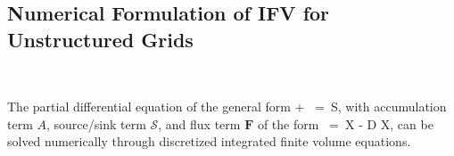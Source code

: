 \documentclass[12pt]{article}
\def\EQ#1\EN{\begin{equation}#1\end{equation}}
\newcommand{\eq}{\ =\ }
\newcommand{\p}{{\partial}}
\renewcommand{\S}{{\mathcal S}}
\newcommand{\bnabla}{\boldsymbol{\nabla}}
\newcommand{\bF}{\boldsymbol{F}}
\newcommand{\bq}{\boldsymbol{q}}
\begin{document}
\subsection*{Numerical Formulation of IFV for Unstructured Grids}
\vspace{-16pt}
~
\indent

The partial differential equation of the general form
\EQ
\frac{\p A}{\p t} + \bnabla\cdot\bF \eq \S,
\EN
with accumulation term $A$, source/sink term $\S$, and flux term $\bF$ of the form
\EQ
\bF \eq \bq\rho X - \phi D \rho\bnabla X,
\EN
can be solved numerically through discretized integrated finite volume equations. 
\end{document}
